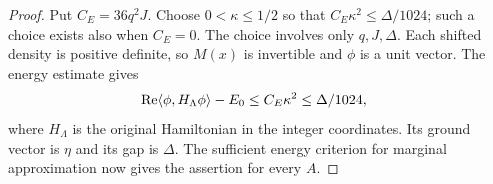 \begin{proof}
    Put $C_E=36q^2J$. Choose $0<\kappa\leq1/2$ so that
    $C_E\kappa^2\leq\Delta/1024$; such a choice exists also when $C_E=0$.
    The choice involves only $q,J,\Delta$.
    Each shifted density is positive definite, so $M(x)$ is invertible
    and $\phi$ is a unit vector. The energy estimate gives
    \begin{align}
         & \operatorname{Re}\langle\phi,H_\Lambda\phi\rangle-E_0
        \leq C_E\kappa^2\leq\Delta/1024, \notag
    \end{align}
    where $H_\Lambda$ is the original Hamiltonian in the integer
    coordinates. Its ground vector is $\eta$ and its gap is $\Delta$.
    The sufficient energy criterion for marginal approximation now gives
    the assertion for every $A$.
\end{proof}
